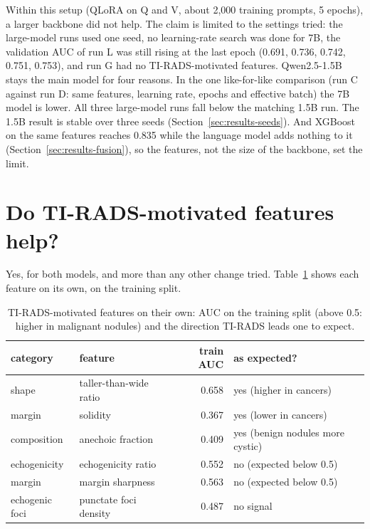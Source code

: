Within this setup (QLoRA on Q and V, about 2,000 training prompts, 5 epochs), a larger backbone
did not help. The claim is limited to the settings tried: the large-model runs used one seed, no
learning-rate search was done for 7B, the validation AUC of run L was still rising at the last
epoch (0.691, 0.736, 0.742, 0.751, 0.753), and run G had no TI-RADS-motivated features.
Qwen2.5-1.5B stays the main model for four reasons. In the one like-for-like comparison (run C
against run D: same features, learning rate, epochs and effective batch) the 7B model is lower.
All three large-model runs fall below the matching 1.5B run. The 1.5B result is stable over three
seeds (Section~\ref{sec:results-seeds}). And XGBoost on the same features reaches 0.835 while the
language model adds nothing to it (Section~\ref{sec:results-fusion}), so the features, not the
size of the backbone, set the limit.

\section{Do TI-RADS-motivated features help?}
\label{sec:results-clinical}

Yes, for both models, and more than any other change tried. Table~\ref{tab:results-clinical-uni}
shows each feature on its own, on the training split.

\begin{table}[ht]
  \centering
  \small
  \caption{TI-RADS-motivated features on their own: AUC on the training split (above 0.5: higher
           in malignant nodules) and the direction TI-RADS leads one to expect.}
  \label{tab:results-clinical-uni}
  \begin{tabular}{llrl}
    \toprule
    category & feature & train AUC & as expected? \\
    \midrule
    shape          & taller-than-wide ratio & 0.658 & yes (higher in cancers) \\
    margin         & solidity               & 0.367 & yes (lower in cancers) \\
    composition    & anechoic fraction      & 0.409 & yes (benign nodules more cystic) \\
    echogenicity   & echogenicity ratio     & 0.552 & no (expected below 0.5) \\
    margin         & margin sharpness       & 0.563 & no (expected below 0.5) \\
    echogenic foci & punctate foci density  & 0.487 & no signal \\
    \bottomrule
  \end{tabular}
\end{table}

